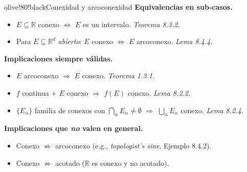 \documentclass[11pt,twoside]{article}
\newcommand{\R}{\mathbb{R}}
\begin{document}
\medskip

\begin{equivbox}{olive!80!black}{Conexidad y arcoconexidad}
\textbf{Equivalencias en sub-casos.}
\begin{itemize}[leftmargin=2em,itemsep=2pt]
\item $E \subseteq \R$ conexo $\Leftrightarrow$ $E$ es un intervalo. \hfill\textit{Teorema 8.3.2.}
\item Para $E \subseteq \R^{d}$ \emph{abierto}: $E$ conexo $\Leftrightarrow$ $E$ arcoconexo. \hfill\textit{Lema 8.4.4.}
\end{itemize}

\textbf{Implicaciones siempre válidas.}
\begin{itemize}[leftmargin=2em,itemsep=2pt]
\item $E$ arcoconexo $\Rightarrow$ $E$ conexo. \hfill\textit{Teorema 1.3.1.}
\item $f$ continua $+$ $E$ conexo $\Rightarrow$ $f(E)$ conexo. \hfill\textit{Lema 8.2.2.}
\item $\{E_{\alpha}\}$ familia de conexos con $\bigcap_{\alpha} E_{\alpha} \neq \emptyset$ $\Rightarrow$ $\bigcup_{\alpha} E_{\alpha}$ conexo. \hfill\textit{Lema 8.2.4.}
\end{itemize}

\textbf{Implicaciones que \emph{no} valen en general.}
\begin{itemize}[leftmargin=2em,itemsep=2pt]
\item Conexo $\not\Rightarrow$ arcoconexo (e.g., \emph{topologist's sine}, Ejemplo 8.4.2).
\item Conexo $\not\Rightarrow$ acotado ($\R$ es conexo y no acotado).
\end{itemize}
\end{equivbox}

\medskip
\end{document}
